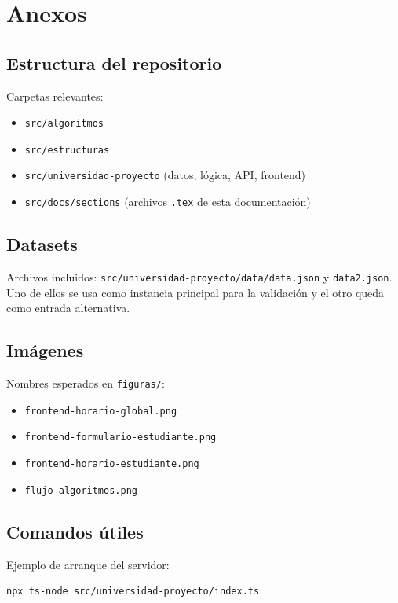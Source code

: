 \chapter{Anexos}

\section{Estructura del repositorio}

Carpetas relevantes:
\begin{itemize}[leftmargin=1.5cm]
  \item \texttt{src/algoritmos}
  \item \texttt{src/estructuras}
  \item \texttt{src/universidad-proyecto} (datos, lógica, API, frontend)
  \item \texttt{src/docs/sections} (archivos \texttt{.tex} de esta documentación)
\end{itemize}

\section{Datasets}

Archivos incluidos: \texttt{src/universidad-proyecto/data/data.json} y \texttt{data2.json}. Uno de ellos se usa como instancia principal para la validación y el otro queda como entrada alternativa.

\section{Imágenes}

Nombres esperados en \texttt{figuras/}:
\begin{itemize}[leftmargin=1.5cm]
  \item \texttt{frontend-horario-global.png}
  \item \texttt{frontend-formulario-estudiante.png}
  \item \texttt{frontend-horario-estudiante.png}
  \item \texttt{flujo-algoritmos.png}
\end{itemize}

\section{Comandos útiles}

Ejemplo de arranque del servidor:
\begin{verbatim}
npx ts-node src/universidad-proyecto/index.ts
\end{verbatim}
